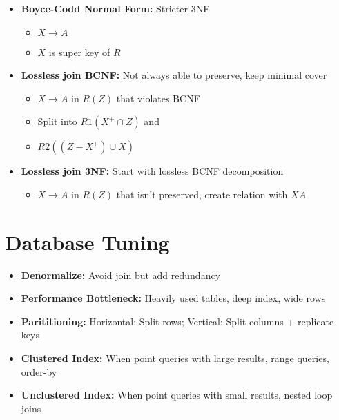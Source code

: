 \documentclass[landscape, letterpaper]{extarticle}
\begin{document}
\begin{multicols}{3}
\begin{itemize}[noitemsep,nolistsep]
\begin{itemize}
              \end{itemize}
        \item \textbf{Boyce-Codd Normal Form:} Stricter 3NF
              \begin{itemize}[noitemsep,nolistsep]
                  \item \(X \rightarrow A\)
                  \item \(X\) is super key of \(R\)
              \end{itemize}
        \item \textbf{Lossless join BCNF:} Not always able to preserve, keep minimal cover
              \begin{itemize}[noitemsep,nolistsep]
                  \item \(X \rightarrow A\) in \(R(Z)\) that violates BCNF
                  \item Split into \(R1\left( X^+ \cap Z \right)\) and
                  \item \(R2\left( \left(Z - X^+\right) \cup X \right)\)
              \end{itemize}
        \item \textbf{Lossless join 3NF:} Start with lossless BCNF decomposition
              \begin{itemize}[noitemsep,nolistsep]
                  \item \(X \rightarrow A\) in \(R(Z)\) that isn't preserved, create relation with \(XA\)
              \end{itemize}
    \end{itemize}
    \section*{Database Tuning}
    \begin{itemize}[noitemsep,nolistsep]
        \item \textbf{Denormalize:} Avoid join but add redundancy
        \item \textbf{Performance Bottleneck:} Heavily used tables, deep index, wide rows
        \item \textbf{Parititioning:} Horizontal: Split rows; Vertical: Split columns + replicate keys
        \item \textbf{Clustered Index:} When point queries with large results, range queries, order-by
        \item \textbf{Unclustered Index:} When point queries with small results, nested loop joins
    \end{itemize}


\end{multicols}
\end{document}
